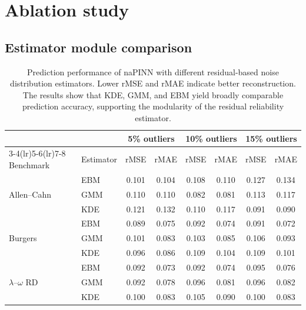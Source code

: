 \documentclass{article}
\theoremstyle{plain}
\theoremstyle{definition}
\theoremstyle{remark}
\begin{document}
\section{Ablation study}
\label{appendix:ablation}

\subsection{Estimator module comparison}
\label{appendix:estimator_comparison}

\begin{sc}
\begin{table}
\centering
\small
\caption{Prediction performance of naPINN with different residual-based noise distribution estimators. Lower rMSE and rMAE indicate better reconstruction. The results show that KDE, GMM, and EBM yield broadly comparable prediction accuracy, supporting the modularity of the residual reliability estimator.}
\label{tab:estimator_comparison}
\setlength{\tabcolsep}{4pt}
\begin{tabular}{llcccccc}
\toprule
 & & \multicolumn{2}{c}{5\% outliers} & \multicolumn{2}{c}{10\% outliers} & \multicolumn{2}{c}{15\% outliers} \\
\cmidrule(lr){3-4}\cmidrule(lr){5-6}\cmidrule(lr){7-8}
Benchmark & Estimator & rMSE & rMAE & rMSE & rMAE & rMSE & rMAE \\
\midrule
\multirow{3}{*}{Allen--Cahn}
 & EBM & 0.101 & 0.104 & 0.108 & 0.110 & 0.127 & 0.134 \\
 & GMM & 0.110 & 0.110 & 0.082 & 0.081 & 0.113 & 0.117 \\
 & KDE & 0.121 & 0.132 & 0.110 & 0.117 & 0.091 & 0.090 \\
\midrule
\multirow{3}{*}{Burgers}
 & EBM & 0.089 & 0.075 & 0.092 & 0.074 & 0.091 & 0.072 \\
 & GMM & 0.101 & 0.083 & 0.103 & 0.085 & 0.106 & 0.093 \\
 & KDE & 0.096 & 0.086 & 0.109 & 0.104 & 0.109 & 0.101 \\
\midrule
\multirow{3}{*}{$\lambda$--$\omega$ RD}
 & EBM & 0.092 & 0.073 & 0.092 & 0.074 & 0.095 & 0.076 \\
 & GMM & 0.092 & 0.078 & 0.096 & 0.081 & 0.096 & 0.082 \\
 & KDE & 0.100 & 0.083 & 0.105 & 0.090 & 0.100 & 0.083 \\
\bottomrule
\end{tabular}%
\end{table}
\end{sc}
\end{document}
